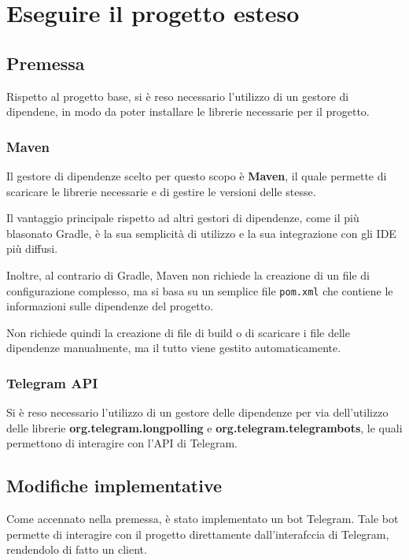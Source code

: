 \section{Eseguire il progetto esteso}

\subsection{Premessa}

Rispetto al progetto base, si è reso necessario l'utilizzo di un gestore di dipendene, in modo da poter installare le librerie necessarie per il progetto. 

\subsubsection*{Maven}

Il gestore di dipendenze scelto per questo scopo è \textbf{Maven}, il quale permette di scaricare le librerie necessarie e di gestire le versioni delle stesse.

Il vantaggio principale rispetto ad altri gestori di dipendenze, come il più blasonato Gradle, è la sua semplicità di utilizzo e la sua integrazione con gli IDE più diffusi. 

Inoltre, al contrario di Gradle, Maven non richiede la creazione di un file di configurazione complesso, ma si basa su un semplice file \texttt{pom.xml} che contiene le informazioni sulle dipendenze del progetto. 

Non richiede quindi la creazione di file di build o di scaricare i file delle dipendenze manualmente, ma il tutto viene gestito automaticamente. 

\subsubsection*{Telegram API}

Si è reso necessario l'utilizzo di un gestore delle dipendenze per via dell'utilizzo delle librerie \textbf{org.telegram.longpolling} e \textbf{org.telegram.telegrambots}, le quali permettono di interagire con l'API di Telegram. 

\subsection{Modifiche implementative}

Come accennato nella premessa, è stato implementato un bot Telegram. Tale bot permette di interagire con il progetto direttamente dall'interafccia di Telegram, rendendolo di fatto un client. 

